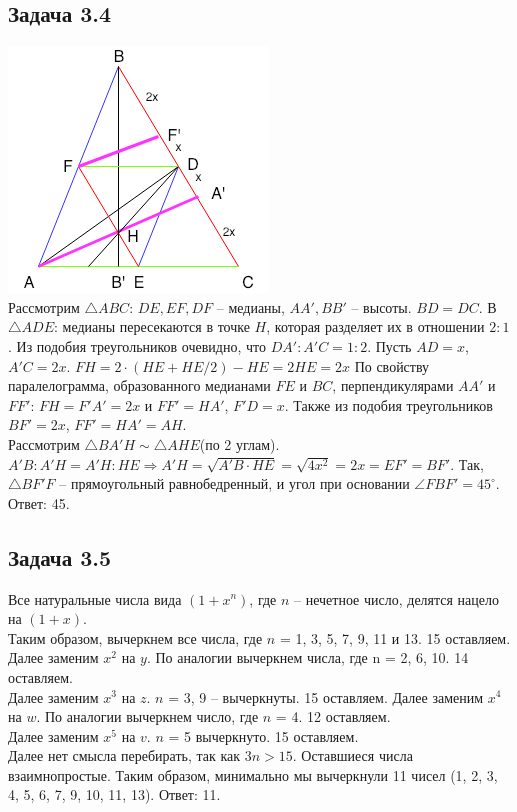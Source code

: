 \documentclass[12pt]{article}
\begin{document}
\subsection*{Задача 3.4}
\includegraphics{math34}\\
Рассмотрим $\triangle ABC$: $DE, EF, DF$ -- медианы, $AA', BB'$ -- высоты. $BD = DC$. В $\triangle ADE$: медианы пересекаются в точке $H$, которая разделяет их в отношении $2:1$. Из подобия треугольников очевидно, что $DA':A'C = 1:2$. 
Пусть $AD = x$, $A'C = 2x$. $FH = 2 \cdot (HE + HE/2) - HE = 2HE = 2x$ По свойству паралелограмма, образованного медианами $FE$ и $BC$, перпендикулярами $AA'$ и $FF'$: $FH = F'A' = 2x$ и $FF'=HA'$, $F'D = x$. Также из подобия треугольников $BF' = 2x$, $FF'=HA'=AH$. \\
Рассмотрим $\triangle BA'H\sim\triangle AHE$(по 2 углам). $A'B:A'H=A'H:HE \Rightarrow A'H = \sqrt{A'B\cdot HE} = \sqrt{4x^2} = 2x = EF'=BF'$. 
Так, $\triangle BF'F$ -- прямоугольный равнобедренный, и угол при основании $\angle FBF' = 45^\circ$.\\
Ответ: 45.
\subsection*{Задача 3.5}
Все натуральные числа вида $(1 + x^n)$, где $n$ -- нечетное число, делятся нацело на $(1+x)$. \\
Таким образом, вычеркнем все числа, где $n$ = 1, 3, 5, 7, 9, 11 и 13. 15 оставляем.\\
Далее заменим $x^2$ на $y$. По аналогии вычеркнем числа, где n = 2, 6, 10. 14 оставляем.\\
Далее заменим $x^3$ на $z$. $n$ = 3, 9 -- вычеркнуты. 15 оставляем. 
Далее заменим $x^4$ на $w$. По аналогии вычеркнем число, где $n$ = 4. 12 оставляем.\\
Далее заменим $x^5$ на $v$. $n$ = 5 вычеркнуто. 15 оставляем. \\
Далее нет смысла перебирать, так как $3n > 15$. Оставшиеся числа взаимнопростые. Таким образом, минимально мы вычеркнули 11 чисел (1, 2, 3, 4, 5, 6, 7, 9, 10, 11, 13).
Ответ: 11.
\end{document}
